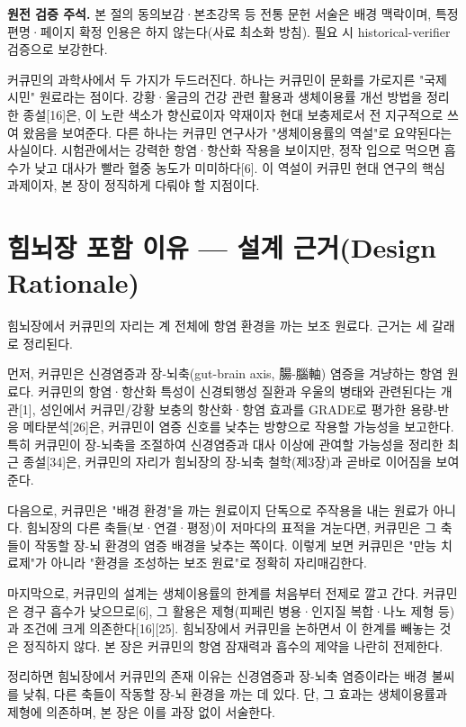\documentclass[12pt,oneside]{book}
\newenvironment{authnote}
  {\par\smallskip\begingroup\leftskip=6mm\rightskip=3mm\small\color{muted}\noindent\ignorespaces}
  {\par\endgroup\smallskip}
\begin{document}
\begin{authnote}\textbf{원전 검증 주석.} 본 절의 동의보감·본초강목 등 전통 문헌 서술은 배경 맥락이며, 특정 편명·페이지 확정 인용은 하지 않는다(사료 최소화 방침). 필요 시 historical-verifier 검증으로 보강한다.\end{authnote}

커큐민의 과학사에서 두 가지가 두드러진다. 하나는 커큐민이 문화를 가로지른 "국제 시민" 원료라는 점이다. 강황·울금의 건강 관련 활용과 생체이용률 개선 방법을 정리한 종설[16]은, 이 노란 색소가 향신료이자 약재이자 현대 보충제로서 전 지구적으로 쓰여 왔음을 보여준다. 다른 하나는 커큐민 연구사가 "생체이용률의 역설"로 요약된다는 사실이다. 시험관에서는 강력한 항염·항산화 작용을 보이지만, 정작 입으로 먹으면 흡수가 낮고 대사가 빨라 혈중 농도가 미미하다[6]. 이 역설이 커큐민 현대 연구의 핵심 과제이자, 본 장이 정직하게 다뤄야 할 지점이다.

\section{힘뇌장 포함 이유 — 설계 근거(Design Rationale)}

힘뇌장에서 커큐민의 자리는 계 전체에 항염 환경을 까는 보조 원료다. 근거는 세 갈래로 정리된다.

먼저, 커큐민은 신경염증과 장-뇌축(gut-brain axis, 腸-腦軸) 염증을 겨냥하는 항염 원료다. 커큐민의 항염·항산화 특성이 신경퇴행성 질환과 우울의 병태와 관련된다는 개관[1], 성인에서 커큐민/강황 보충의 항산화·항염 효과를 GRADE로 평가한 용량-반응 메타분석[26]은, 커큐민이 염증 신호를 낮추는 방향으로 작용할 가능성을 보고한다. 특히 커큐민이 장-뇌축을 조절하여 신경염증과 대사 이상에 관여할 가능성을 정리한 최근 종설[34]은, 커큐민의 자리가 힘뇌장의 장-뇌축 철학(제3장)과 곧바로 이어짐을 보여준다.

다음으로, 커큐민은 "배경 환경"을 까는 원료이지 단독으로 주작용을 내는 원료가 아니다. 힘뇌장의 다른 축들(보·연결·평정)이 저마다의 표적을 겨눈다면, 커큐민은 그 축들이 작동할 장-뇌 환경의 염증 배경을 낮추는 쪽이다. 이렇게 보면 커큐민은 "만능 치료제"가 아니라 "환경을 조성하는 보조 원료"로 정확히 자리매김한다.

마지막으로, 커큐민의 설계는 생체이용률의 한계를 처음부터 전제로 깔고 간다. 커큐민은 경구 흡수가 낮으므로[6], 그 활용은 제형(피페린 병용·인지질 복합·나노 제형 등)과 조건에 크게 의존한다[16][25]. 힘뇌장에서 커큐민을 논하면서 이 한계를 빼놓는 것은 정직하지 않다. 본 장은 커큐민의 항염 잠재력과 흡수의 제약을 나란히 전제한다.

정리하면 힘뇌장에서 커큐민의 존재 이유는 신경염증과 장-뇌축 염증이라는 배경 불씨를 낮춰, 다른 축들이 작동할 장-뇌 환경을 까는 데 있다. 단, 그 효과는 생체이용률과 제형에 의존하며, 본 장은 이를 과장 없이 서술한다.
\end{document}

